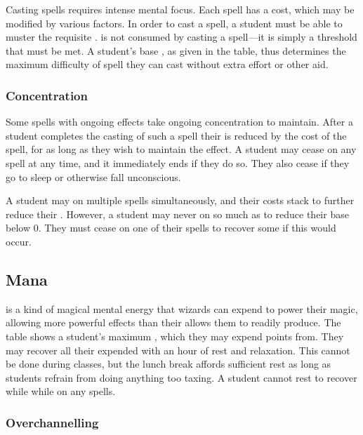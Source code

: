 Casting spells requires intense mental focus.
Each spell has a {\focus} cost, which may be modified by various factors.
In order to cast a spell, a student must be able to muster the requisite {\focus}.
\capital{\focus} is not consumed by casting a spell---it is simply a threshold that must be met.
A student's base {\focus}, as given in the  table, thus determines the maximum difficulty of spell they can cast without extra effort or other aid.

\subsubsection{Concentration}

Some spells with ongoing effects take ongoing concentration to maintain.
After a student completes the casting of such a spell their {\focus} is reduced by the {\concentration} cost of the spell, for as long as they wish to maintain the effect.
A student may cease {\concentrating} on any spell at any time, and it immediately ends if they do so.
They also cease {\concentrating} if they go to sleep or otherwise fall unconscious.

A student may {\concentrate} on multiple spells simultaneously, and their {\concentration} costs stack to further reduce their {\focus}.
However, a student may never {\concentrate} on so much as to reduce their base {\focus} below 0.
They must cease {\concentrating} on one of their spells to recover some {\focus} if this would occur.

\subsection{Mana}

\capital{\mana} is a kind of magical mental energy that wizards can expend to power their magic, allowing more powerful effects than their {\focus} allows them to readily produce.
The  table shows a student's maximum {\mana}, which they may expend points from.
They may recover all their expended {\mana} with an hour of rest and relaxation.
This cannot be done during classes, but the lunch break affords sufficient rest as long as students refrain from doing anything too taxing.
A student cannot rest to recover while {\mana} while {\concentrating} on any spells.

\subsubsection{Overchannelling}

